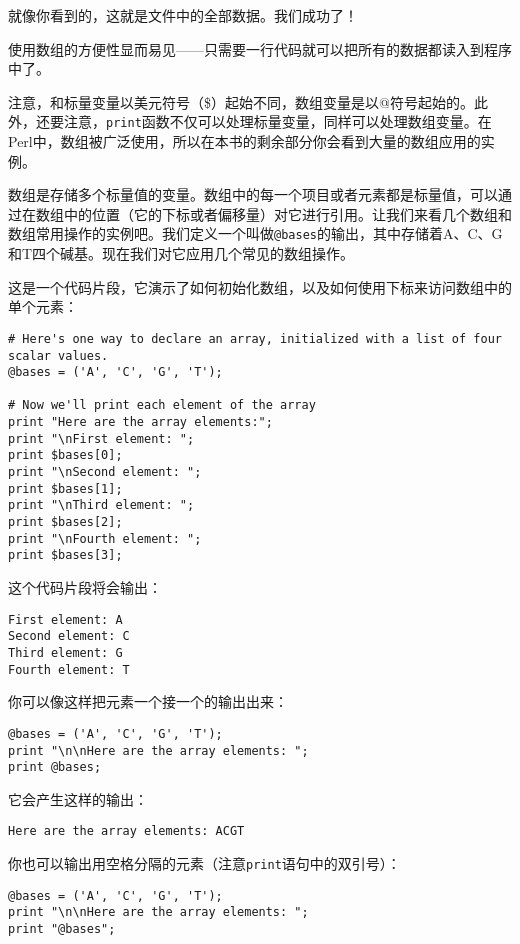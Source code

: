 就像你看到的，这就是文件中的全部数据。我们成功了！

使用数组的方便性显而易见——只需要一行代码就可以把所有的数据都读入到程序中了。

注意，和标量变量以美元符号（\$）起始不同，数组变量是以@符号起始的。此外，还要注意，\verb|print|函数不仅可以处理标量变量，同样可以处理数组变量。在Perl中，数组被广泛使用，所以在本书的剩余部分你会看到大量的数组应用的实例。

数组是存储多个标量值的变量。数组中的每一个项目或者元素都是标量值，可以通过在数组中的位置（它的下标或者偏移量）对它进行引用。让我们来看几个数组和数组常用操作的实例吧。我们定义一个叫做\verb|@bases|的输出，其中存储着A、C、G和T四个碱基。现在我们对它应用几个常见的数组操作。

这是一个代码片段，它演示了如何初始化数组，以及如何使用下标来访问数组中的单个元素：

\begin{lstlisting}
# Here's one way to declare an array, initialized with a list of four scalar values.
@bases = ('A', 'C', 'G', 'T');

# Now we'll print each element of the array
print "Here are the array elements:";
print "\nFirst element: ";
print $bases[0];
print "\nSecond element: ";
print $bases[1];
print "\nThird element: ";
print $bases[2];
print "\nFourth element: ";
print $bases[3];
\end{lstlisting}

这个代码片段将会输出：

\begin{lstlisting}
First element: A
Second element: C
Third element: G
Fourth element: T
\end{lstlisting}

你可以像这样把元素一个接一个的输出出来：

\begin{lstlisting}
@bases = ('A', 'C', 'G', 'T');
print "\n\nHere are the array elements: ";
print @bases;
\end{lstlisting}

它会产生这样的输出：

\begin{lstlisting}
Here are the array elements: ACGT
\end{lstlisting}

你也可以输出用空格分隔的元素（注意\verb|print|语句中的双引号）：

\begin{lstlisting}
@bases = ('A', 'C', 'G', 'T');
print "\n\nHere are the array elements: ";
print "@bases";
\end{lstlisting}

